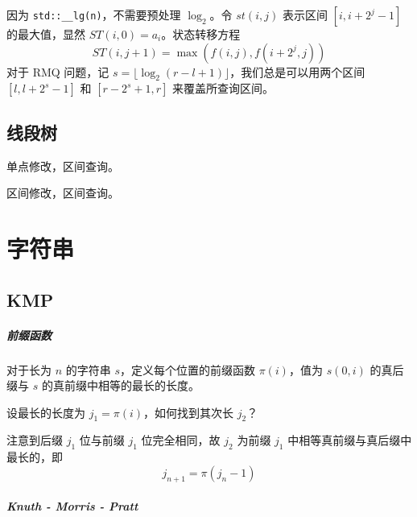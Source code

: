 \documentclass{probook}
\begin{document}
\begin{multicols}{2}
因为 \lstinline{std::__lg(n)}，不需要预处理 $\log_2$。令 $st(i,j)$ 表示区间 $[i,i+2^j-1]$ 的最大值，显然 $ST(i,0)=a_i$。状态转移方程
\[ ST(i,j+1) = \max(f(i,j) , f(i+2^{j},j)) \]
对于 RMQ 问题，记 $s = \lfloor\log_2(r-l+1)\rfloor$，我们总是可以用两个区间 $[l,l+2^s-1]$ 和 $[r-2^s+1,r]$ 来覆盖所查询区间。



\section{线段树}

单点修改，区间查询。



区间修改，区间查询。









\chapter{字符串}

\section{KMP}

\paragraph{前缀函数}

对于长为 $n$ 的字符串 $s$，定义每个位置的前缀函数 $\pi(i)$，值为 $s(0,i)$ 的真后缀与 $s$ 的真前缀中相等的最长的长度。

设最长的长度为 $j_1=\pi(i)$，如何找到其次长 $j_2$？

注意到后缀 $j_1$ 位与前缀 $j_1$ 位完全相同，故 $j_2$ 为前缀 $j_1$ 中相等真前缀与真后缀中最长的，即
\[j_{n+1} = \pi(j_n-1)\]



\paragraph{Knuth - Morris - Pratt}


\end{multicols}
\end{document}
